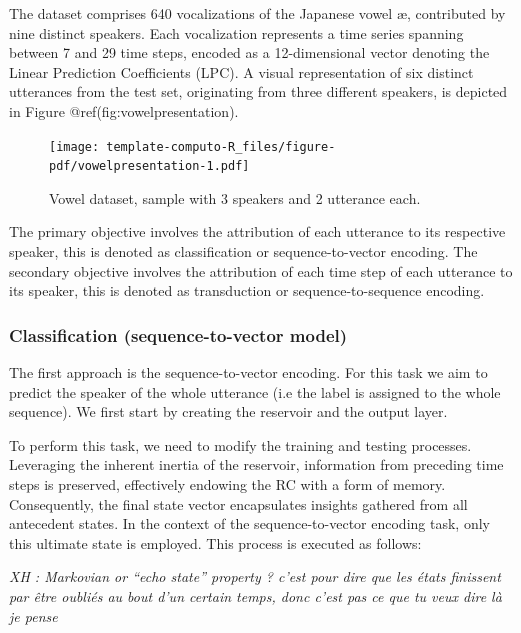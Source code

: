 \documentclass[
  11pt,
  a4paper,
]{article}
\theoremstyle{plain}
\theoremstyle{remark}
\begin{document}
The dataset comprises 640 vocalizations of the Japanese vowel \ae,
contributed by nine distinct speakers. Each vocalization represents a
time series spanning between 7 and 29 time steps, encoded as a
12-dimensional vector denoting the Linear Prediction Coefficients (LPC).
A visual representation of six distinct utterances from the test set,
originating from three different speakers, is depicted in Figure
@ref(fig:vowelpresentation).

\begin{figure}[H]

{\centering \texttt{[image: template-computo-R\_files/figure-pdf/vowelpresentation-1.pdf]}

}

\caption{Vowel dataset, sample with 3 speakers and 2 utterance each.}

\end{figure}%

The primary objective involves the attribution of each utterance to its
respective speaker, this is denoted as classification or
sequence-to-vector encoding. The secondary objective involves the
attribution of each time step of each utterance to its speaker, this is
denoted as transduction or sequence-to-sequence encoding.

\subsubsection{Classification (sequence-to-vector
model)}\label{classification-sequence-to-vector-model}

The first approach is the sequence-to-vector encoding. For this task we
aim to predict the speaker of the whole utterance (i.e the label is
assigned to the whole sequence). We first start by creating the
reservoir and the output layer.

To perform this task, we need to modify the training and testing
processes. Leveraging the inherent inertia of the reservoir, information
from preceding time steps is preserved, effectively endowing the RC with
a form of memory. Consequently, the final state vector encapsulates
insights gathered from all antecedent states. In the context of the
sequence-to-vector encoding task, only this ultimate state is employed.
This process is executed as follows:

\emph{XH : Markovian or ``echo state'' property ? c'est pour dire que
les états finissent par être oubliés au bout d'un certain temps, donc
c'est pas ce que tu veux dire là je pense}
\end{document}
